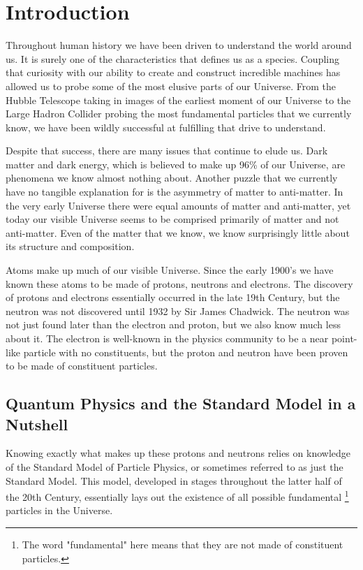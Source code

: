 \chapter{Introduction}
\label{ch:introduction}
Throughout human history we have been driven to understand the world around us. It is surely one of the characteristics that defines us as a species. Coupling that curiosity with our ability to create and construct incredible machines has allowed us to probe some of the most elusive parts of our Universe. From the Hubble Telescope taking in images of the earliest moment of our Universe to the Large Hadron Collider probing the most fundamental particles that we currently know, we have been wildly successful at fulfilling that drive to understand.

Despite that success, there are many issues that continue to elude us. Dark matter and dark energy, which is believed to make up 96\% of our Universe, are phenomena we know almost nothing about. Another puzzle that we currently have no tangible explanation for is the asymmetry of matter to anti-matter. In the very early Universe there were equal amounts of matter and anti-matter, yet today our visible Universe seems to be comprised primarily of matter and not anti-matter. Even of the matter that we know, we know surprisingly little about its structure and composition.

Atoms make up much of our visible Universe. Since the early 1900's we have known these atoms to be made of protons, neutrons and electrons. The discovery of protons and electrons essentially occurred in the late 19th Century, but the neutron was not discovered until 1932 by Sir James Chadwick. The neutron was not just found later than the electron and proton, but we also know much less about it. The electron is well-known in the physics community to be a near point-like particle with no constituents, but the proton and neutron have been proven to be made of constituent particles.

\section{Quantum Physics and the Standard Model in a Nutshell}
Knowing exactly what makes up these protons and neutrons relies on knowledge of the Standard Model of Particle Physics, or sometimes referred to as just the Standard Model. This model, developed in stages throughout the latter half of the 20th Century, essentially lays out the existence of all possible fundamental \footnote{The word "fundamental" here means that they are not made of constituent particles.} particles in the Universe.

